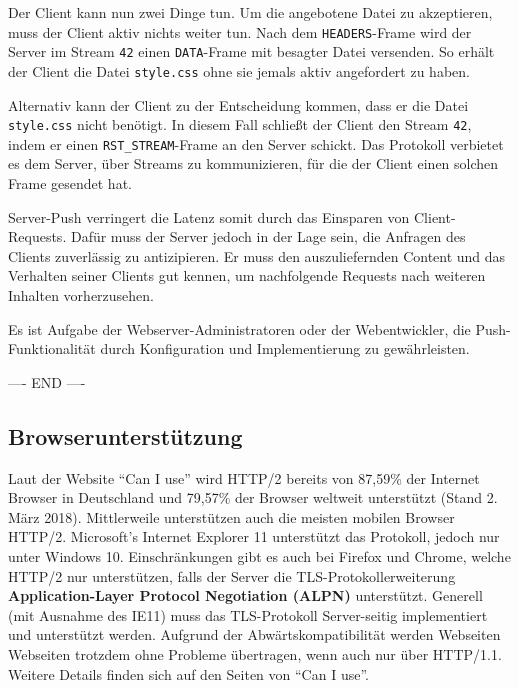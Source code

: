 \documentclass[a4paper, justified, notoc]{tufte-handout} %
\begin{document}
Der Client kann nun zwei Dinge tun. Um die angebotene Datei zu akzeptieren, muss der Client aktiv nichts weiter tun. Nach dem \texttt{HEADERS}-Frame wird der Server im Stream \texttt{42} einen \texttt{DATA}-Frame mit besagter Datei versenden. So erhält der Client die Datei \texttt{style.css} ohne sie jemals aktiv angefordert zu haben.

Alternativ kann der Client zu der Entscheidung kommen, dass er die Datei \texttt{style.css} nicht benötigt. In diesem Fall schließt der Client den Stream \texttt{42}, indem er einen \texttt{RST\_STREAM}-Frame an den Server schickt. Das Protokoll verbietet es dem Server, über Streams zu kommunizieren, für die der Client einen solchen Frame gesendet hat.

Server-Push verringert die Latenz somit durch das Einsparen von Client-Requests. Dafür muss der Server jedoch in der Lage sein, die Anfragen des Clients zuverlässig zu antizipieren. Er muss den auszuliefernden Content und das Verhalten seiner Clients gut kennen, um nachfolgende Requests nach weiteren Inhalten vorherzusehen.

Es ist Aufgabe der Webserver-Administratoren oder der Webentwickler, die Push-Funktionalität durch Konfiguration und Implementierung zu gewährleisten.

---- END ----


\subsection{Browserunterstützung} %
\label{sub:browserunterstutzung}
Laut der Website ``Can I use'' wird HTTP/2 bereits von 87,59\% der Internet Browser in Deutschland und 79,57\% der Browser weltweit unterstützt (Stand 2. März 2018). 
Mittlerweile unterstützen auch die meisten mobilen Browser HTTP/2. 
Microsoft's Internet Explorer 11 unterstützt das Protokoll, jedoch nur unter Windows 10.
Einschränkungen gibt es auch bei Firefox und Chrome, welche HTTP/2 nur unterstützen, falls der Server die TLS-Protokollerweiterung \textbf{Application-Layer Protocol Negotiation (ALPN)} unterstützt.
Generell (mit Ausnahme des IE11) muss das TLS-Protokoll Server-seitig implementiert und unterstützt werden.
Aufgrund der Abwärtskompatibilität werden Webseiten Webseiten trotzdem ohne Probleme übertragen, wenn auch nur über HTTP/1.1.
Weitere Details finden sich auf den Seiten von ``Can I use''. %
\end{document}
